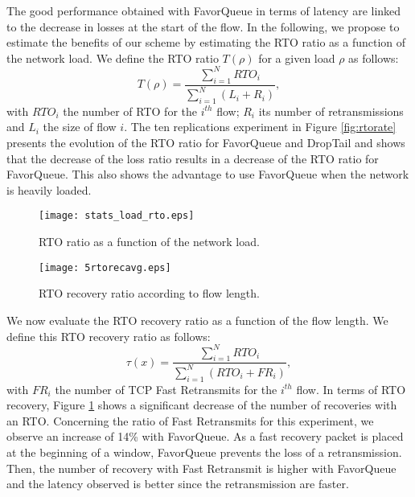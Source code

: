 \documentclass{elsart}
\begin{document}
The good performance obtained with FavorQueue in terms of latency are linked to the decrease in losses at the start of the flow.
In the following, we propose to estimate the benefits of our scheme by estimating the RTO ratio as a function of the network load. 
We define the RTO ratio $T(\rho)$ for a given load $\rho$ as follows:
\begin{equation}
\label{eq:rto}
T(\rho) = \frac{\sum_{i=1}^{N} {RTO}_{i}} {\sum_{i=1}^{N} (L_{i}+R_{i})},
\end{equation}
with ${RTO}_{i}$ the number of RTO for the $i^{th}$ flow; $R_i$ its number of retransmissions and $L_{i}$ the size of flow $i$.
The ten replications experiment in Figure \ref{fig:rtorate} presents the evolution of the RTO ratio for FavorQueue and DropTail and shows that the decrease of the loss ratio results 
in a decrease of the RTO ratio for FavorQueue. This also shows the advantage to use FavorQueue when the network is heavily loaded.


\begin{figure}[htb!]
   \begin{minipage}[b]{1.0\columnwidth}
	\centering
	\texttt{[image: stats\_load\_rto.eps]}
	\caption{RTO ratio as a function of the network load.}
	\label{fig:rtorate}
   \end{minipage}

   \begin{minipage}[b]{1.0\columnwidth}   
	\centering
	\texttt{[image: 5rtorecavg.eps]}
	\caption{RTO recovery ratio according to flow length.}
	\label{fig:rtorec}
   \end{minipage}
\end{figure}

We now evaluate the RTO recovery ratio as a function of the flow length. We define this RTO recovery ratio as follows:
\begin{equation}
\label{eq:taux}
\tau(x) = \frac{\sum_{i=1}^{N} {RTO}_{i}} {\sum_{i=1}^{N} ({RTO}_{i}+ {FR}_{i})},
\end{equation}
with ${FR}_{i}$ the number of TCP Fast Retransmits for the $i^{th}$ flow. In terms of RTO recovery, Figure \ref{fig:rtorec} shows a significant decrease of 
the number of recoveries with an RTO. Concerning the ratio of Fast Retransmits for this experiment, we observe an increase of 14\% with FavorQueue. 
As a fast recovery packet is placed at the beginning of a window, FavorQueue prevents the loss of a retransmission. 
Then, the number of recovery with Fast Retransmit is higher with FavorQueue and the latency observed is better since the retransmission are faster.
\end{document}
